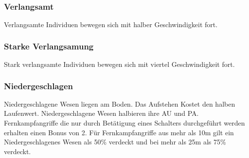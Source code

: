 \documentclass[../../Heldenanleitung2]{subfiles}
\begin{document}
\subsubsection{Verlangsamt}
Verlangsamte Individuen bewegen sich mit halber Geschwindigkeit fort.

\subsubsection{Starke Verlangsamung}
Stark verlangsamte Individuen bewegen sich mit viertel Geschwindigkeit fort.

\subsubsection{Niedergeschlagen}
Niedergeschlagene Wesen liegen am Boden. Das Aufstehen Kostet den halben Laufenwert. Niedergeschlagene Wesen halbieren ihre AU und PA. Fernkampfangriffe die nur durch Betätigung eines Schalters durchgeführt werden erhalten einen Bonus von 2. Für Fernkampfangriffe aus mehr als 10m gilt ein Niedergeschlagenes Wesen als 50\% verdeckt und bei mehr als 25m als 75\% verdeckt.
\end{document}
